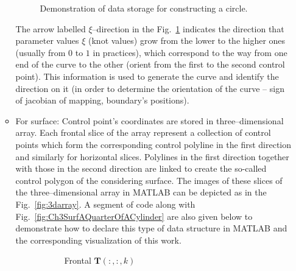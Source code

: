 \begin{itemize}
\begin{itemize}
                \begin{figure}[H]
                    \centering
                    \normalsize
                    
                    \caption{Demonstration of data storage for constructing a circle.}
                    \label{fig:Ch3NURBSCircTriBasedMethod}
                 \end{figure}
                 The arrow labelled $\xi$--direction in the Fig.~\ref{fig:Ch3NURBSCircTriBasedMethod} indicates the direction that parameter values $\xi$ (knot values) grow from the lower to the higher ones (usually from $0$ to $1$ in practices), which correspond to the way from one end of the curve to the other (orient from the first to the second control point). This information is used to generate the curve and identify the direction on it (in order to determine the orientation of the curve -- sign of jacobian of mapping, boundary's positions).
            \item For surface: Control point's coordinates are stored in three--dimensional array. Each frontal slice of the array represent a collection of control points which form the corresponding control polyline in the first direction and similarly for horizontal slices. Polylines in the first direction together with those in the second direction are linked to create the so-called control polygon of the considering surface. The images of these slices of the three--dimensional array in MATLAB can be depicted as in the Fig.~\ref{fig:3darray}. A segment of code along with Fig.~\ref{fig:Ch3SurfAQuarterOfACylinder} are also given below to demonstrate how to declare this type of data structure in MATLAB and the corresponding visualization of this work.
                \begin{figure}[H]
                    \centering
                    \begin{subfigure}[b]{0.3\textwidth}
                        \normalsize
                        
                        \caption{Frontal $\mathbf{T}(:, :, k)$}
                        \label{Ch3FrontalSlices}
                    \end{subfigure}
                    \qquad \qquad
                    \begin{subfigure}[b]{0.3\textwidth}

\end{subfigure}
\end{figure}
\end{itemize}
\end{itemize}

